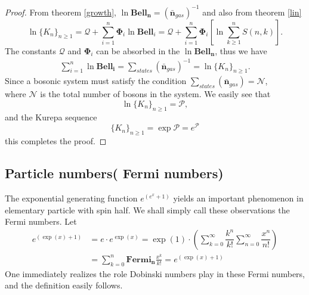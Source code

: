 \documentclass[pdflatex,sn-mathphys-num]{sn-jnl}%
\theoremstyle{thmstyleone}%
\theoremstyle{thmstyletwo}%
\theoremstyle{thmstylethree}%
\begin{document}
\begin{proof}
    From theorem \ref{growth},  $ \ln\mathbf{Bell_n}=(\bar{\mathbf{n}}_{gas})^{-1}$ and also from theorem \ref{lin}
$$ \ln \lbrace K_n\rbrace_{n\geq 1}=\mathcal{Q}+\sum_{i=1}^{n}\mathbf{\Phi}_i \ln\mathbf{Bell}_i=\mathcal{Q}+\sum_{i=1}^{n}\mathbf{\Phi}_i\left[ \ln \sum_{k\geq 1}^{n} S(n,k)\right].$$
The constants $\mathcal{Q}$ and $\mathbf{\Phi}_i $ can be absorbed in the $\ln\mathbf{Bell_n}$, thus we have 
\begin{align}
\sum_{i=1}^{n}  \ln\mathbf{Bell_i}=\sum_{states}(\bar{\mathbf{n}}_{gas})^{-1}= \ln \lbrace K_n\rbrace_{n\geq 1}.
\end{align}
Since a bosonic system must satisfy the condition $\sum_{states}(\bar{\mathbf{n}}_{gas})=\mathcal{N}$, \\where $\mathcal{N}$ is the total number of bosons in the system. We easily see that 
\begin{equation*}
    \ln \lbrace K_n\rbrace_{n\geq 1}=\mathcal{P},
\end{equation*}
and the Kurepa sequence 
\begin{equation}
    \lbrace K_n\rbrace_{n\geq 1}=\exp{\mathcal{P}} =e^{\mathcal{P}}
\end{equation}
this completes the proof.
\end{proof}





\subsection{Particle numbers( Fermi numbers)}
The exponential generating function $e^{(e^{x}+1)}$ yields an important phenomenon in elementary particle with spin half. We shall simply call these observations the Fermi numbers. Let
\begin{align}\label{eqnfermi}
     e^{(\exp{(x)}+1)}&= e \cdotp e^{\exp{(x)}}=\exp(1)\cdotp  \left(\sum_{k=0}^{\infty}\dfrac{k^n}{k!}\sum_{n=0}^{\infty}\dfrac{x^n}{n!} \right)\\ \nonumber
     &=\sum_{k=0}^{n}\mathbf{Fermi_n}\frac{x^k}{k!}=  e^{(\exp{(x)}+1)}
\end{align}
One immediately realizes the role Dobinski numbers play in these Fermi numbers, and the definition easily follows. 
\end{document}
